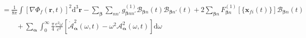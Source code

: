 \documentclass{article}
\begin{document}
\begin{equation}
\begin{split}
&= \frac{1}{8\pi}\int\left[\nabla\Phi_f(\mathbf{r},t)\right]^2\mathrm{d}^3\mathbf{r} - \sum_{\bm{\beta}}\sum_{nn'}g_{\bm{\beta}nn'}^{(1)}\mathcal{B}_{\bm{\beta}n}(t)\mathcal{B}_{\bm{\beta}n'}(t) + 2\sum_{\bm{\beta}n}F_{\bm{\beta}n}^{(1)}[\{\mathbf{x}_{fi}(t)\}]\mathcal{B}_{\bm{\beta}n}(t)\\
&\qquad + \sum_{\bm{\alpha}}\int_0^\infty\frac{\pi}{4}\frac{e^2\omega}{c^3}\left[\dot{\mathcal{A}}_{\bm{\alpha}}^2(\omega,t) - \omega^2\mathcal{A}_{\bm{\alpha}}^2(\omega,t)\right]\mathrm{d}\omega
\end{split}
\end{equation}
\end{document}
